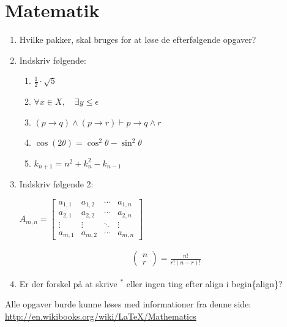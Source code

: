 \documentclass[12pt]{article}
\begin{document}
\section{Matematik}
	\begin{enumerate}
  		\item Hvilke pakker, skal bruges for at løse de efterfølgende opgaver?
  		\item Indskriv følgende:
			\begin{enumerate}				
				\item $\frac{1}{2} \cdot \sqrt{5}$
				\item $\forall x \in X, \quad \exists y \leq \epsilon$
				\item $(p \rightarrow q) \wedge (p \rightarrow r) \vdash p \rightarrow q \wedge r$
				\item $\cos (2\theta) = \cos^2 \theta - \sin^2 \theta$
				\item $k_{n+1} = n^2 + k_n^2 - k_{n-1}$
			\end{enumerate}
 		\item Indskriv følgende 2:
\begin{center}
	$A_{m,n} =
 	\begin{bmatrix}
  		a_{1,1} & a_{1,2} & \cdots & a_{1,n} \\
  		a_{2,1} & a_{2,2} & \cdots & a_{2,n} \\
  		\vdots  & \vdots  & \ddots & \vdots  \\
  		a_{m,1} & a_{m,2} & \cdots & a_{m,n}
 	\end{bmatrix}$
\end{center}

\begin{align}
\left(\!
    \begin{array}{c}
      n \\
      r
    \end{array}
  \!\right) = \frac{n!}{r!(n-r)!}
\end{align}
		\item Er der forskel på at skrive $^*$ eller ingen ting efter align i begin\{align\}?
	\end{enumerate}

Alle opgaver burde kunne løses med informationer fra denne side:\\
\url{http://en.wikibooks.org/wiki/LaTeX/Mathematics}
\end{document}
